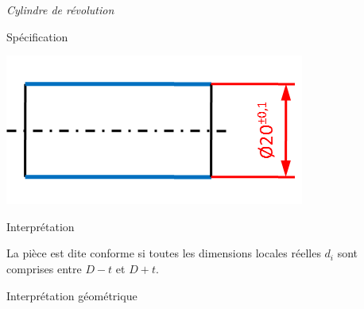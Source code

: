 \documentclass[11pt,oneside]{article}
\begin{document}
\begin{exemple}
\textit{Cylindre de révolution}

\begin{minipage}[t]{.3\linewidth}
\begin{center}
Spécification

\includegraphics[width=.95\textwidth]{png/lin_cyl}
\end{center}
\end{minipage} \hfill
\begin{minipage}[t]{.3\linewidth}
\begin{center}
Interprétation
\end{center}

La pièce est dite conforme si toutes les dimensions locales réelles $d_i$ sont comprises entre $D-t$ et $D+t$.
\end{minipage} \hfill
\begin{minipage}[t]{.3\linewidth}
\begin{center}
Interprétation géométrique

\end{center}
\end{minipage}

\end{exemple}

\newpage
\end{document}

